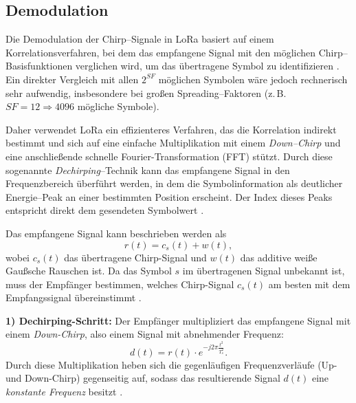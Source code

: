 \subsection{Demodulation \label{lora:demodulation}}

	Die Demodulation der Chirp–Signale in LoRa basiert auf einem Korrelationsverfahren, bei dem das empfangene Signal mit den möglichen Chirp–Basisfunktionen verglichen wird, um das übertragene Symbol zu identifizieren \cite{Afisiadis:2020, Guo:2022}. Ein direkter Vergleich mit allen \( 2^{SF} \) möglichen Symbolen wäre jedoch rechnerisch sehr aufwendig, insbesondere bei gro{\ss}en Spreading–Faktoren (z.\,B. \( SF = 12 \Rightarrow 4096 \) mögliche Symbole).

	\medskip
	Daher verwendet LoRa ein effizienteres Verfahren, das die Korrelation indirekt bestimmt und sich auf eine einfache Multiplikation mit einem \emph{Down–Chirp} und eine anschlie{\ss}ende schnelle Fourier-Transformation (FFT) stützt. Durch diese sogenannte \emph{Dechirping}–Technik kann das empfangene Signal in den Frequenzbereich überführt werden, in dem die Symbolinformation als deutlicher Energie–Peak an einer bestimmten Position erscheint. Der Index dieses Peaks entspricht direkt dem gesendeten Symbolwert \cite{Vangelista:2017}.

	\medskip
	Das empfangene Signal kann beschrieben werden als
	\[
	r(t) = c_s(t) + w(t),
	\]
	wobei \( c_s(t) \) das übertragene Chirp-Signal und \( w(t) \) das additive wei{\ss}e Gau{\ss}sche Rauschen ist. Da das Symbol \( s \) im übertragenen Signal unbekannt ist, muss der Empfänger bestimmen, welches Chirp-Signal \( c_s(t) \) am besten mit dem Empfangssignal übereinstimmt \cite{Vangelista:2017}.
	
	\medskip
	\textbf{1) Dechirping-Schritt:}  
	Der Empfänger multipliziert das empfangene Signal mit einem \emph{Down-Chirp}, also einem Signal mit abnehmender Frequenz:
	\[
	d(t) = r(t) \cdot e^{-j 2 \pi \frac{t^2}{T_s^2}}.
	\]
	Durch diese Multiplikation heben sich die gegenläufigen Frequenzverläufe (Up- und Down-Chirp) gegenseitig auf, sodass das resultierende Signal \( d(t) \) eine \emph{konstante Frequenz} besitzt \cite{Vangelista:2017, Afisiadis:2020}.
	
